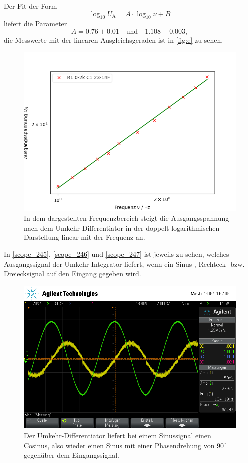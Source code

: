 Der Fit der Form
\begin{equation}
	\log_{10} U_\text{A} = A \cdot \log_{10} \nu + B
\end{equation}
liefert die Parameter
\begin{equation}
	A = 0.76 \pm 0.01 \quad \text{und} \quad 1.108 \pm 0.003,
\end{equation}
die Messwerte mit der linearen Ausgleichsgeraden ist in \autoref{fig:e} zu sehen.
\begin{figure}[h]
	\centering
	\includegraphics[width=\textwidth]{img/e.png}
	\caption{In dem dargestellten Frequenzbereich steigt die Ausgangsspannung nach dem Umkehr-Differentiator in der doppelt-logarithmischen Darstellung linear mit der Frequenz an.}
	\label{fig:e}
\end{figure}
In \autoref{scope_245}, \autoref{scope_246} und \autoref{scope_247} ist jeweils zu sehen, welches Ausgangssignal der Umkehr-Integrator liefert, wenn ein Sinus-, Rechteck- bzw. Dreiecksignal auf den Eingang gegeben wird.
\begin{figure}[h]
	\centering
	\includegraphics[width=\textwidth]{usb/scope_245.png}
	\caption{Der Umkehr-Differentiator liefert bei einem Sinussignal einen Cosinus, also wieder einen Sinus mit einer Phasendrehung von $90^\circ$ gegenüber dem Eingangssignal.}
	\label{scope_245}
\end{figure}
